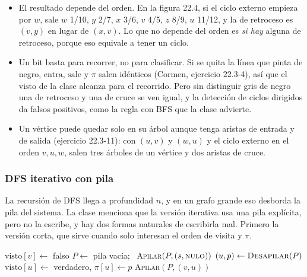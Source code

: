 \documentclass[11pt,letterpaper]{article}
\begin{document}
\begin{ojo}
  \begin{itemize}[leftmargin=1.2em, itemsep=0.15em]
    \item El resultado depende del orden. En la figura 22.4, si el
      ciclo externo empieza por $w$, sale $w$ 1/10, $y$ 2/7, $x$ 3/6,
      $v$ 4/5, $z$ 8/9, $u$ 11/12, y la de retroceso es $(v, y)$ en
      lugar de $(x, v)$. Lo que no depende del orden es
      \textit{si hay} alguna de retroceso, porque eso equivale a
      tener un ciclo.
    \item Un bit basta para recorrer, no para clasificar. Si se quita
      la línea que pinta de negro, $\text{entra}$, $\text{sale}$ y
      $\pi$ salen idénticos (Cormen, ejercicio 22.3-4), así que el
      $\text{visto}$ de la clase alcanza para el recorrido. Pero sin
      distinguir gris de negro una de retroceso y una de cruce se ven
      igual, y la detección de ciclos dirigidos da falsos positivos,
      como la regla con BFS que la clase advierte.
    \item Un vértice puede quedar solo en su árbol aunque tenga
      aristas de entrada y de salida (ejercicio 22.3-11): con $(u, v)$
      y $(w, u)$ y el ciclo externo en el orden $v, u, w$, salen tres
      árboles de un vértice y dos aristas de cruce.
  \end{itemize}
\end{ojo}

\subsubsection*{DFS iterativo con pila}

La recursión de DFS llega a profundidad $n$, y en un grafo grande eso
desborda la pila del sistema. La clase menciona que la versión
iterativa usa una pila explícita, pero no la escribe, y hay dos formas
naturales de escribirla mal. Primero la versión corta, que sirve
cuando solo interesan el orden de visita y $\pi$.

\begin{algorithm}[H]
\caption{\textsc{DFS-Pila}$(G, s)$: orden de visita y padres}
\label{alg:busq-dfs-pila}
\begin{algorithmic}[1]
    \State $\text{visto}[v] \gets$ falso
  \EndFor
  \State $P \gets$ pila vacía; \ \textsc{Apilar}$(P, (s, \textsc{nulo}))$
    \State $(u, p) \gets \textsc{Desapilar}(P)$
     
      \State $\text{visto}[u] \gets$ verdadero, \quad $\pi[u] \gets p$
          \State \textsc{Apilar}$(P, (v, u))$
        \EndIf
      \EndFor
    \EndIf
  \EndWhile
\EndProcedure
\end{algorithmic}
\end{algorithm}
\end{document}
